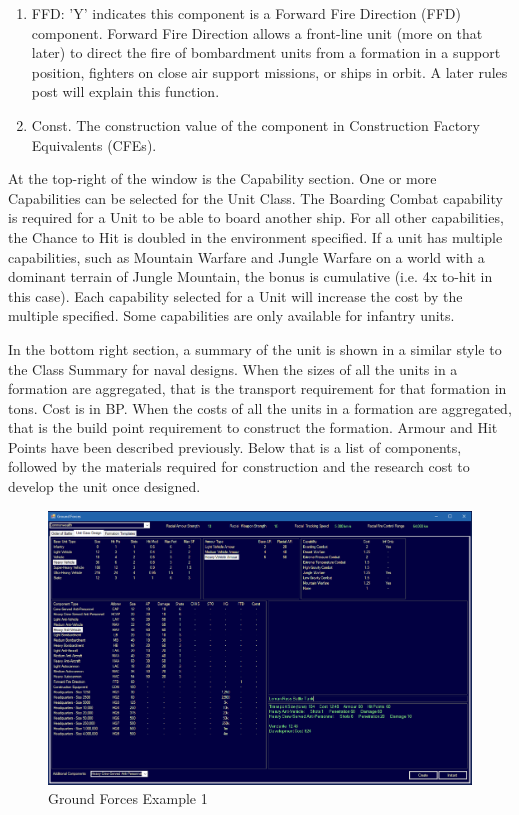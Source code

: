 \documentclass[../../../Aurora C# unofficial manual.tex]{subfiles}
\begin{document}
\begin{enumerate}
		\item FFD: 'Y' indicates this component is a Forward Fire Direction (FFD) component. Forward Fire Direction allows a front-line unit (more on that later) to direct the fire of bombardment units from a formation in a support position, fighters on close air support missions, or ships in orbit. A later rules post will explain this function.
		\item Const. The construction value of the component in Construction Factory Equivalents (CFEs).
	\end{enumerate}
	
	At the top-right of the window is the Capability section. One or more Capabilities can be selected for the Unit Class. The Boarding Combat capability is required for a Unit to be able to board another ship. For all other capabilities, the Chance to Hit is doubled in the environment specified. If a unit has multiple capabilities, such as Mountain Warfare and Jungle Warfare on a world with a dominant terrain of Jungle Mountain, the bonus is cumulative (i.e. 4x to-hit in this case). Each capability selected for a Unit will increase the cost by the multiple specified. Some capabilities are only available for infantry units.
	
	In the bottom right section, a summary of the unit is shown in a similar style to the Class Summary for naval designs. When the sizes of all the units in a formation are aggregated, that is the transport requirement for that formation in tons. Cost is in BP. When the costs of all the units in a formation are aggregated, that is the build point requirement to construct the formation. Armour and Hit Points have been described previously. Below that is a list of components, followed by the materials required for construction and the research cost to develop the unit once designed.
	\begin{figure}[H]
		\centering
		\includegraphics[width=0.9\linewidth]{images/GroundForces}
		\caption[Ground Forces]{Ground Forces Example 1}
		\label{fig:groundforces}
	\end{figure}
	
\end{document}
